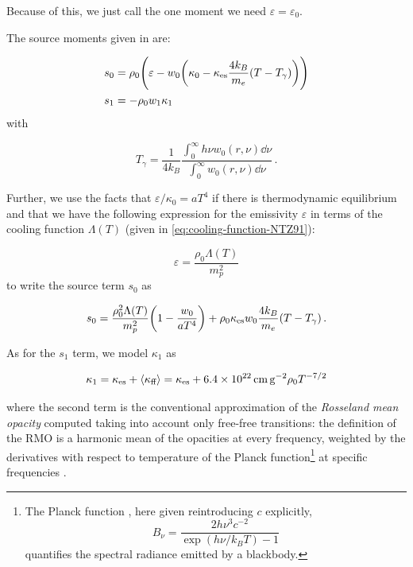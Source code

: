 \documentclass[main.tex]{subfiles}
\begin{document}
Because of this, we just call the one moment we need \(\varepsilon = \varepsilon_0\).

The source moments given in \cite[eq. 6]{NobiliTurollaZampieri:1991dec} are:

\begin{subequations}
\begin{align}
  s_0 &= \rho_0 \qty(\varepsilon - w_0 \qty(\kappa_0 - \kappa_{\text{es}} \frac{4 k_B}{m_e} (T - T_\gamma)))  \\
  s_1 &= - \rho_0 w_1 \kappa_1
\end{align}
\end{subequations}
with

\begin{equation}
    T_\gamma = \frac{1}{4 k_B} \frac{\displaystyle \int_0^\infty h \nu w_0 (r, \nu) \dd{\nu}}{\displaystyle \int_0^\infty w_0 (r, \nu) \dd{\nu}}\,.
\end{equation}
%

Further, we use the facts that \(\varepsilon / \kappa_0 = a T^4\) if there is thermodynamic equilibrium and that we have the following expression for the emissivity \(\varepsilon\) in terms of the cooling function \(\Lambda (T)\) (given in \eqref{eq:cooling-function-NTZ91}):

\begin{equation}
    \varepsilon = \frac{\rho_0 \Lambda (T)}{m_p^2}
\end{equation}
to write the source term \(s_0\) as

\begin{equation}
    s_0 = \frac{\rho_0^2 \Lambda (T)}{m_p^2} \qty(1 - \frac{w_0}{aT^4}) + \rho_0 \kappa_{\text{es}} w_0 \frac{4 k_B}{m_e} (T - T_\gamma)\,.
\end{equation}

As for the \(s_1\) term, we model \(\kappa_1\) as

\begin{equation}
  \kappa_1 = \kappa_{\text{es}} + \expval{\kappa_{\text{ff}}}
  = \kappa_{\text{es}} + \SI{6.4e22}{\centi\metre\square\per\gram} \rho_0 T^{-7/2}
\end{equation}

where the second term is the conventional approximation of the \emph{Rosseland mean opacity} computed taking into account only free-free transitions: the definition of the RMO is a harmonic mean of the opacities at every frequency, weighted by the derivatives with respect to temperature of the Planck function\footnote{The Planck function \cite[eq. 1.51]{RybickiLightman:2004}, here given reintroducing \(c\) explicitly,
\[
B_\nu = \frac{2h \nu^3 c^{-2}}{\exp(h\nu / k_B T) - 1}
\]
quantifies the spectral radiance emitted by a blackbody.
}
at specific frequencies \cite[eq. 1.110]{RybickiLightman:2004}.
\end{document}
